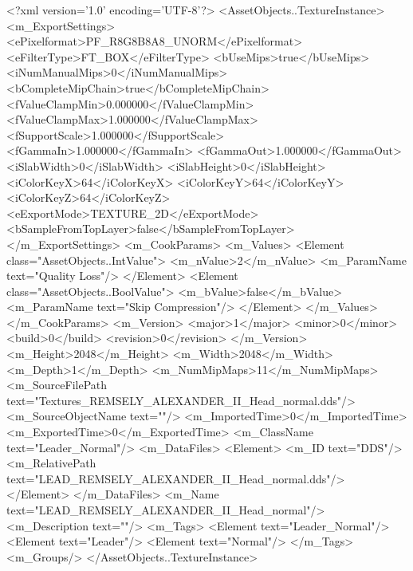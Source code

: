 <?xml version='1.0' encoding='UTF-8'?>
<AssetObjects..TextureInstance>
  <m_ExportSettings>
    <ePixelformat>PF_R8G8B8A8_UNORM</ePixelformat>
    <eFilterType>FT_BOX</eFilterType>
    <bUseMips>true</bUseMips>
    <iNumManualMips>0</iNumManualMips>
    <bCompleteMipChain>true</bCompleteMipChain>
    <fValueClampMin>0.000000</fValueClampMin>
    <fValueClampMax>1.000000</fValueClampMax>
    <fSupportScale>1.000000</fSupportScale>
    <fGammaIn>1.000000</fGammaIn>
    <fGammaOut>1.000000</fGammaOut>
    <iSlabWidth>0</iSlabWidth>
    <iSlabHeight>0</iSlabHeight>
    <iColorKeyX>64</iColorKeyX>
    <iColorKeyY>64</iColorKeyY>
    <iColorKeyZ>64</iColorKeyZ>
    <eExportMode>TEXTURE_2D</eExportMode>
    <bSampleFromTopLayer>false</bSampleFromTopLayer>
  </m_ExportSettings>
  <m_CookParams>
    <m_Values>
      <Element class="AssetObjects..IntValue">
        <m_nValue>2</m_nValue>
        <m_ParamName text="Quality Loss"/>
      </Element>
      <Element class="AssetObjects..BoolValue">
        <m_bValue>false</m_bValue>
        <m_ParamName text="Skip Compression"/>
      </Element>
    </m_Values>
  </m_CookParams>
  <m_Version>
    <major>1</major>
    <minor>0</minor>
    <build>0</build>
    <revision>0</revision>
  </m_Version>
  <m_Height>2048</m_Height>
  <m_Width>2048</m_Width>
  <m_Depth>1</m_Depth>
  <m_NumMipMaps>11</m_NumMipMaps>
  <m_SourceFilePath text="Textures\LEAD_REMSELY_ALEXANDER_II_Head_normal.dds"/>
  <m_SourceObjectName text=""/>
  <m_ImportedTime>0</m_ImportedTime>
  <m_ExportedTime>0</m_ExportedTime>
  <m_ClassName text="Leader_Normal"/>
  <m_DataFiles>
    <Element>
      <m_ID text="DDS"/>
      <m_RelativePath text="LEAD_REMSELY_ALEXANDER_II_Head_normal.dds"/>
    </Element>
  </m_DataFiles>
  <m_Name text="LEAD_REMSELY_ALEXANDER_II_Head_normal"/>
  <m_Description text=""/>
  <m_Tags>
    <Element text="Leader_Normal"/>
    <Element text="Leader"/>
    <Element text="Normal"/>
  </m_Tags>
  <m_Groups/>
</AssetObjects..TextureInstance>
